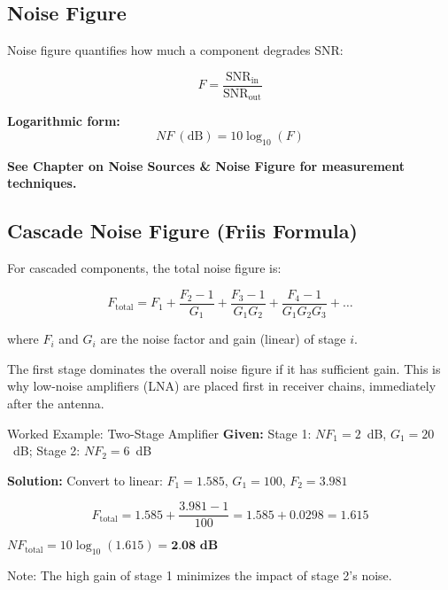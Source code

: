 \subsection{Noise Figure}
\label{subsec:noise-figure}

Noise figure quantifies how much a component degrades SNR:

\begin{equation}
\label{eq:noise-figure-linear}
F = \frac{\text{SNR}_{\text{in}}}{\text{SNR}_{\text{out}}}
\end{equation}

\textbf{Logarithmic form:}
\begin{equation}
\label{eq:noise-figure-db}
NF\ (\text{dB}) = 10\log_{10}(F)
\end{equation}

\textbf{See Chapter on Noise Sources \& Noise Figure for measurement techniques.}

\subsection{Cascade Noise Figure (Friis Formula)}
\label{subsec:cascade-noise-figure}

For cascaded components, the total noise figure is:

\begin{equation}
\label{eq:friis-noise}
F_{\text{total}} = F_1 + \frac{F_2 - 1}{G_1} + \frac{F_3 - 1}{G_1 G_2} + \frac{F_4 - 1}{G_1 G_2 G_3} + \ldots
\end{equation}

where $F_i$ and $G_i$ are the noise factor and gain (linear) of stage $i$.

\begin{keyconcept}
The first stage dominates the overall noise figure if it has sufficient gain. This is why low-noise amplifiers (LNA) are placed first in receiver chains, immediately after the antenna.
\end{keyconcept}

\begin{calloutbox}{Worked Example: Two-Stage Amplifier}
\textbf{Given:} Stage 1: $NF_1 = 2$~dB, $G_1 = 20$~dB; Stage 2: $NF_2 = 6$~dB

\textbf{Solution:} Convert to linear: $F_1 = 1.585$, $G_1 = 100$, $F_2 = 3.981$

\[
F_{\text{total}} = 1.585 + \frac{3.981 - 1}{100} = 1.585 + 0.0298 = 1.615
\]

$NF_{\text{total}} = 10\log_{10}(1.615) = \textbf{2.08~dB}$

Note: The high gain of stage 1 minimizes the impact of stage 2's noise.
\end{calloutbox}

